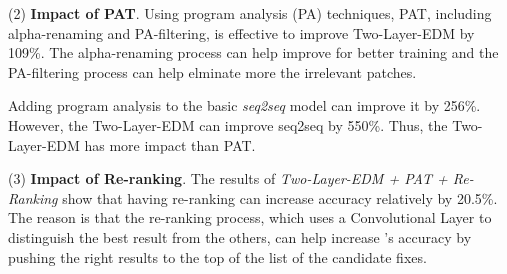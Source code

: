 (2) \textbf{Impact of PAT}. Using program analysis (PA) techniques,
PAT, including alpha-renaming and PA-filtering, is effective to
improve Two-Layer-EDM by 109\%.
The alpha-renaming process can help improve {\tool} for better training
and the PA-filtering process can help elminate more the irrelevant patches.

Adding program analysis to the basic {\em seq2seq} model can improve
it by 256\%. However, the Two-Layer-EDM can improve seq2seq by 550\%.
Thus, the Two-Layer-EDM has more impact than PAT.

(3) \textbf{Impact of Re-ranking}. The results
of \textit{Two-Layer-EDM + PAT + Re-Ranking} show that having
re-ranking can increase accuracy relatively by 20.5\%. The reason is
that the re-ranking process, which uses a Convolutional Layer to
distinguish the best result from the others, can help increase
{\tool}'s accuracy by pushing the right results to the top of the list
of the candidate fixes.

\fi

